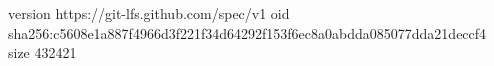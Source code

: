 version https://git-lfs.github.com/spec/v1
oid sha256:c5608e1a887f4966d3f221f34d64292f153f6ec8a0abdda085077dda21deccf4
size 432421
